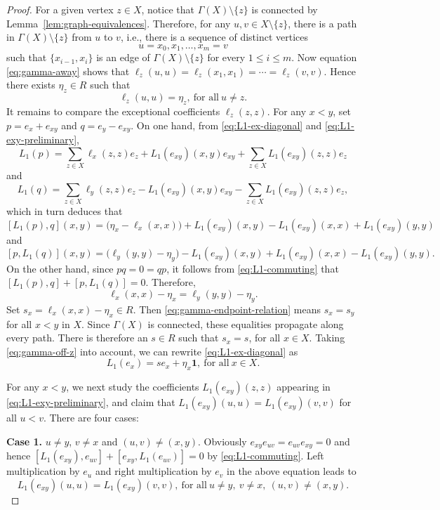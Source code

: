 \documentclass[reqno]{amsart}
\numberwithin{equation}{section}
\theoremstyle{plain}
\theoremstyle{definition}
\newcommand{\one}{\mathbf 1}
\begin{document}
\begin{proof}
For a given vertex $z\in X$, notice that $\Gamma(X)\setminus\{z\}$ is connected by Lemma~\ref{lem:graph-equivalences}.
Therefore, for any $u,v\in X\setminus\{z\}$, there is a path in $\Gamma(X)\setminus\{z\}$ from $u$ to $v$, i.e.,
there is a sequence of distinct vertices
\[
u=x_0,x_1,\ldots,x_m=v
\]
such that $\{x_{i-1},x_i\}$ is an edge of $\Gamma(X)\setminus\{z\}$ for every $1\leq i\leq m$.
Now equation \eqref{eq:gamma-away} shows that $\ell_z(u,u)=\ell_z(x_1,x_1)=\cdots=\ell_z(v,v)$.
Hence there exists $\eta_z\in R$ such that
\begin{equation}\label{eq:gamma-off-z}
\ell_z(u,u)=\eta_z,~\text{for~all}~u\neq z.
\end{equation}
It remains to compare the exceptional coefficients $\ell_z(z,z)$. For any $x<y$, set
$p=e_x+e_{xy}$ and $q=e_y-e_{xy}$. On one hand, from \eqref{eq:L1-ex-diagonal} and \eqref{eq:L1-exy-preliminary},
\[
L_1(p)=\sum_{z\in X}\ell_x(z,z)e_z+L_1(e_{xy})(x,y)e_{xy}+\sum_{z\in X}L_1(e_{xy})(z,z)e_z
\]
and
\[
L_1(q)=\sum_{z\in X}\ell_y(z,z)e_z-L_1(e_{xy})(x,y)e_{xy}-\sum_{z\in X}L_1(e_{xy})(z,z)e_z,
\]
which in turn deduces that
\[
[L_1(p),q](x,y)
=\bigl(\eta_x-\ell_x(x,x)\bigr)
+L_1(e_{xy})(x,y)-L_1(e_{xy})(x,x)+L_1(e_{xy})(y,y)
\]
and
\[
[p,L_1(q)](x,y)
=\bigl(\ell_y(y,y)-\eta_y\bigr)-L_1(e_{xy})(x,y)
+L_1(e_{xy})(x,x)-L_1(e_{xy})(y,y).
\]
On the other hand, since $pq=0=qp$, it follows from \eqref{eq:L1-commuting} that
$[L_1(p),q]+[p,L_1(q)]=0$. Therefore,
\begin{equation}\label{eq:gamma-endpoint-relation}
\ell_x(x,x)-\eta_x
=\ell_y(y,y)-\eta_y.
\end{equation}
Set $s_x=\ell_x(x,x)-\eta_x\in R$. Then \eqref{eq:gamma-endpoint-relation} means $s_x=s_y$ for all $x<y$ in $X$.
Since $\Gamma(X)$ is connected, these equalities propagate along every path. There is therefore an $s\in R$ such that
$s_x=s$, for all $x\in X$. Taking \eqref{eq:gamma-off-z} into account, we can rewrite \eqref{eq:L1-ex-diagonal} as
\begin{equation}\label{eq:L1-ex-final}
L_1(e_x)=se_x+\eta_x\one,~\text{for~all}~x\in X.
\end{equation}

For any $x<y$, we next study the coefficients $L_1(e_{xy})(z,z)$ appearing in \eqref{eq:L1-exy-preliminary}, and
claim that $L_1(e_{xy})(u,u)=L_1(e_{xy})(v,v)$ for all $u<v$. There are four cases:

{\bf Case 1.} $u\neq y$, $v\neq x$ and $(u,v)\neq(x,y)$.
Obviously $e_{xy}e_{uv}=e_{uv}e_{xy}=0$ and hence $[L_1(e_{xy}),e_{uv}]+[e_{xy},L_1(e_{uv})]=0$
by \eqref{eq:L1-commuting}. Left multiplication by $e_u$ and right multiplication by $e_v$ in the above equation leads to
\begin{equation}\label{eq:anti-beta-ordinary}
L_1(e_{xy})(u,u)=L_1(e_{xy})(v,v), ~\text{for~all}~ u\neq y,~ v\neq x,~ (u,v)\neq(x,y).
\end{equation}


\end{proof}
\end{document}
